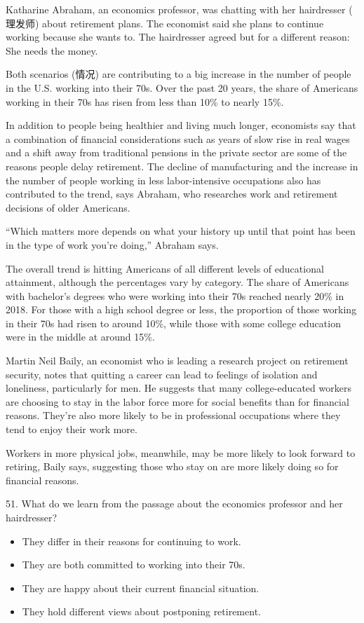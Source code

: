 \documentclass[UTF8,11pt]{ctexart}
\begin{document}
Katharine Abraham, an economics professor, was chatting with her hairdresser ( 理发师) about retirement plans. The economist said she plans to continue working because she wants to. The hairdresser agreed but for a different reason: She needs the money.


Both scenarios (情况) are contributing to a big increase in the number of people in the U.S. working into their 70s. Over the past 20 years, the share of Americans working in their 70s has risen from less than 10\% to nearly 15\%.


In addition to people being healthier and living much longer, economists say that a combination of financial considerations such as years of slow rise in real wages and a shift away from traditional pensions in the private sector are some of the reasons people delay retirement. The decline of manufacturing and the increase in the number of people working in less labor-intensive occupations also has contributed to the trend, says Abraham, who researches work and retirement decisions of older Americans.


“Which matters more depends on what your history up until that point has been in the type of work you’re doing,” Abraham says.


The overall trend is hitting Americans of all different levels of educational attainment, although the percentages vary by category. The share of Americans with bachelor’s degrees who were working into their 70s reached nearly 20\% in 2018. For those with a high school degree or less, the proportion of those working in their 70s had risen to around 10\%, while those with some college education were in the middle at around 15\%.


Martin Neil Baily, an economist who is leading a research project on retirement security, notes that quitting a career can lead to feelings of isolation and loneliness, particularly for men. He suggests that many college-educated workers are choosing to stay in the labor force more for social benefits than for financial reasons. They’re also more likely to be in professional occupations where they tend to enjoy their work more.


Workers in more physical jobs, meanwhile, may be more likely to look forward to retiring, Baily says, suggesting those who stay on are more likely doing so for financial reasons.


51. What do we learn from the passage about the economics professor and her hairdresser?


\begin{itemize}[leftmargin=2em,itemsep=.2em,topsep=.4em]\item[A.] They differ in their reasons for continuing to work.
\item[B.] They are both committed to working into their 70s.
\item[C.] They are happy about their current financial situation.
\item[D.] They hold different views about postponing retirement.
\end{itemize}
\end{document}
